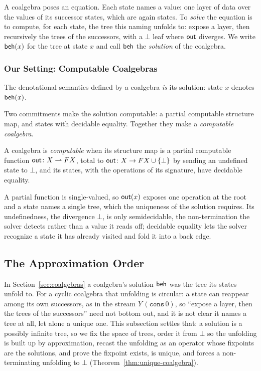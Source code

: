A coalgebra poses an equation. Each state names a value: one layer of data over the values of its successor states, which are again states. To \emph{solve} the equation is to compute, for each state, the tree this naming unfolds to: expose a layer, then recursively the trees of the successors, with a $\bot$ leaf where $\mathsf{out}$ diverges. We write $\mathsf{beh}(x)$ for the tree at state $x$ and call $\mathsf{beh}$ the \emph{solution} of the coalgebra.

\subsubsection{Our Setting: Computable Coalgebras}

\begin{definition}\label{def:semantics}
  The denotational semantics defined by a coalgebra \emph{is} its solution: state $x$ denotes
  $\mathsf{beh}(x)$.
\end{definition}

\noindent Two commitments make the solution computable: a partial computable structure map, and states with decidable equality. Together they make a \emph{computable coalgebra}.

\begin{definition}\label{def:computable-coalgebra}
  A coalgebra is \emph{computable} when its structure map is a partial computable function $\mathsf{out} \colon X \rightharpoonup F X$, total to $\mathsf{out} \colon X \to F X \cup \{\bot\}$ by sending an undefined state to $\bot$, and its states, with the operations of its signature, have decidable equality.
\end{definition}

\noindent A partial function is single-valued, so $\mathsf{out}(x)$ exposes one operation at the root and a state names a single tree, which the uniqueness of the solution requires. Its undefinedness, the divergence $\bot$, is only semidecidable, the non-termination the solver detects rather than a value it reads off; decidable equality lets the solver recognize a state it has already visited and fold it into a back edge.

\subsection{The Approximation Order}\label{sec:order}

In Section~\ref{sec:coalgebras} a coalgebra's solution $\mathsf{beh}$ was the tree its states unfold to. For a cyclic coalgebra that unfolding is circular: a state can reappear among its own successors, as in the stream $Y\,(\mathtt{cons}\,0)$, so ``expose a layer, then the trees of the successors'' need not bottom out, and it is not clear it names a tree at all, let alone a unique one. This subsection settles that: a solution is a possibly infinite tree, so we fix the space of trees, order it from $\bot$ so the unfolding is built up by approximation, recast the unfolding as an operator whose fixpoints are the solutions, and prove the fixpoint exists, is unique, and forces a non-terminating unfolding to $\bot$ (Theorem~\ref{thm:unique-coalgebra}).


